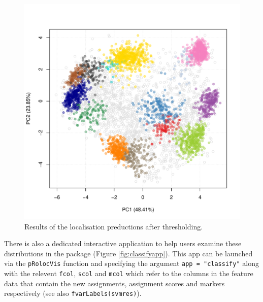 \begin{figure}[!ht]
    \centering
\begin{knitrout}
\color{fgcolor}\begin{kframe}
\begin{alltt}
  \hlstd{=} \hlstd{)}
\end{alltt}
\end{kframe}
\includegraphics[width=.7\textwidth]{figure/plotres-1} 

\end{knitrout}
  \caption{Results of the localisation preductions after thresholding.}
  \label{fig:plotres}
\end{figure}

\bigskip

There is also a dedicated interactive application to help users
examine these distributions in the  package (Figure
\ref{fig:classifyapp}).  This app can be launched via the
\texttt{pRolocVis} function and specifying the argument \texttt{app =
  "classify"} along with the relevent \texttt{fcol}, \texttt{scol} and
\texttt{mcol} which refer to the columns in the feature data that
contain the new assignments, assignment scores and markers
respectively (see also \texttt{fvarLabels(svmres)}).

\begin{knitrout}
\color{fgcolor}\begin{kframe}
\begin{alltt}
\hlstd{(}\hlstd{)}
  \hlstd{=} \hlstd{,}  \hlstd{=} \hlstd{,}  \hlstd{=} \hlstd{,}  \hlstd{=} \hlstd{)}
\end{alltt}
\end{kframe}
\end{knitrout}

